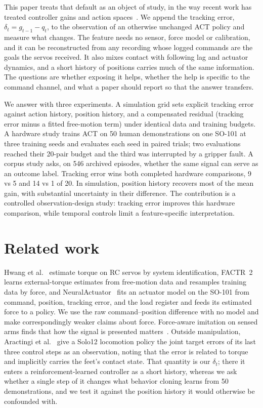 \documentclass{article}
\begin{document}
This paper treats that default as an object of study, in the way recent work
has treated controller gains and action spaces~\citep{bronars2026tune,aljalbout2024action}. We append the tracking
error, $\delta_t = g_{t-1} - q_t$, to the observation of an otherwise unchanged
ACT policy and measure what changes. The feature needs no sensor, force model
or calibration, and it can be reconstructed from any recording whose logged
commands are the goals the servos received. It also mixes contact with following lag and actuator dynamics,
and a short history of positions carries much of the same information. The questions are whether exposing it
helps, whether the help is specific to the command channel, and what a paper
should report so that the answer transfers.

We answer with three experiments. A simulation grid sets explicit tracking
error against action history, position history, and a compensated residual
(tracking error minus a fitted free-motion term) under identical data and
training budgets. A hardware study trains ACT on 50 human demonstrations on
one SO-101 at three training seeds and evaluates each seed in paired trials;
two evaluations reached their 20-pair budget and the third was interrupted by
a gripper fault. A corpus study asks, on 546 archived episodes, whether the
same signal can serve as an outcome label. Tracking error wins both completed
hardware comparisons, 9 vs 5 and 14 vs 1 of 20. In simulation, position history recovers most of the
mean gain, with substantial uncertainty in their difference. The contribution
is a controlled observation-design study: tracking error improves this hardware
comparison, while temporal controls limit a feature-specific interpretation.

\section{Related work}
Hwang et al.~\citep{hwang2018virtual} estimate torque on RC servos by system
identification, FACTR~2~\citep{oh2026factr2} learns external-torque estimates
from free-motion data and resamples training data by force, and
NeuralActuator~\citep{dou2026neuralactuator} fits an actuator model on the
SO-101 from command, position, tracking error, and the load register and feeds
its estimated force to a policy. We use the raw command--position difference
with no model and make correspondingly weaker claims about force. Force-aware imitation on sensed arms finds that how the signal is presented
matters~\citep{liu2025forcemimic,yu2025forcevla}. Outside manipulation,
Aractingi et al.~\citep{aractingi2023solo12} give a Solo12 locomotion policy
the joint target errors of its last three control steps as an observation,
noting that the error is related to torque and implicitly carries the feet's
contact state. That quantity is our $\delta_t$; there it enters a
reinforcement-learned controller as a short history, whereas we ask whether a
single step of it changes what behavior cloning learns from 50 demonstrations,
and we test it against the position history it would otherwise be confounded
with.
\end{document}
